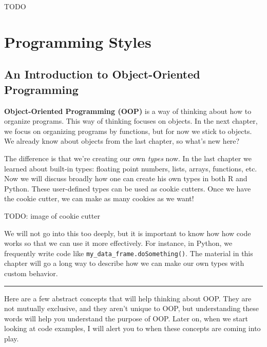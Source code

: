 \documentclass[
  12pt,
]{krantz}
\begin{document}
TODO

\hypertarget{part-programming-styles}{%
\part{Programming Styles}\label{part-programming-styles}}

\hypertarget{an-introduction-to-object-oriented-programming}{%
\chapter{An Introduction to Object-Oriented Programming}\label{an-introduction-to-object-oriented-programming}}

\textbf{Object-Oriented Programming (OOP)} is a way of thinking about how to organize programs. This way of thinking focuses on objects. In the next chapter, we focus on organizing programs by functions, but for now we stick to objects. We already know about objects from the last chapter, so what's new here?

The difference is that we're creating our own \emph{types} now. In the last chapter we learned about built-in types: floating point numbers, lists, arrays, functions, etc. Now we will discuss broadly how one can create his own types in both R and Python. These user-defined types can be used as cookie cutters. Once we have the cookie cutter, we can make as many cookies as we want!

TODO: image of cookie cutter

We will not go into this too deeply, but it is important to know how how code works so that we can use it more effectively. For instance, in Python, we frequently write code like \texttt{my\_data\_frame.doSomething()}. The material in this chapter will go a long way to describe how we can make our own types with custom behavior.

\begin{center}\rule{0.5\linewidth}{0.5pt}\end{center}

Here are a few abstract concepts that will help thinking about OOP. They are not mutually exclusive, and they aren't unique to OOP, but understanding these words will help you understand the purpose of OOP. Later on, when we start looking at code examples, I will alert you to when these concepts are coming into play.
\end{document}

